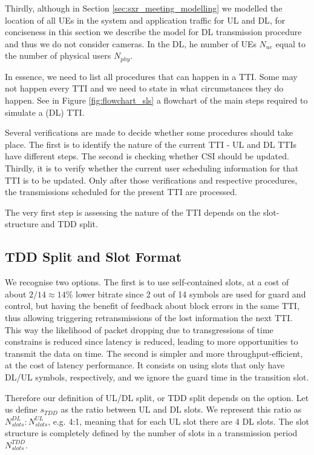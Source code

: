 Thirdly, although in Section \ref{sec:sxr_meeting_modelling} we modelled the location of all \acsp{UE} in the system and application traffic for \acs{UL} and \acs{DL}, for conciseness in this section we describe the model for \acs{DL} transmission procedure and thus we do not consider cameras. In the \acs{DL}, he number of UEs $N_{ue}$ equal to the number of physical users $N_{phy}$.

In essence, we need to list all procedures that can happen in a \acs{TTI}. Some may not happen every \acs{TTI} and we need to state in what circumstances they do happen. See in Figure \ref{fig:flowchart_sls} a flowchart of the main steps required to simulate a (\acs{DL}) \acs{TTI}.


Several verifications are made to decide whether some procedures should take place. The first is to identify the nature of the current \acs{TTI} - UL and DL TTIs have different steps. The second is checking whether CSI should be updated. Thirdly, it is to verify whether the current user scheduling information for that TTI is to be updated. Only after those verifications and respective procedures, the transmissions scheduled for the present TTI are processed. 

The very first step is assessing the nature of the TTI depends on the slot-structure and TDD split.

\subsection*{TDD Split and Slot Format}

We recognise two options. The first is to use self-contained slots, at a cost of about $2/14 \approx 14\%$ lower bitrate since 2 out of 14 symbols are used for guard and control, but having the benefit of feedback about block errors in the same TTI, thus allowing triggering retransmissions of the lost information the next TTI. This way the likelihood of packet dropping due to transgressions of time constrains is reduced since latency is reduced, leading to more opportunities to transmit the data on time. The second is simpler and more throughput-efficient, at the cost of latency performance. It consists on using slots that only have \ac{DL}/\ac{UL} symbols, respectively, and we ignore the guard time in the transition slot.

Therefore our definition of \ac{UL}/\ac{DL} split, or \ac{TDD} split depends on the option. Let us define $s_{TDD}$ as the ratio between UL and DL slots. We represent this ratio as $N^{DL}_{slots} : N^{UL}_{slots}$, e.g. 4:1, meaning that for each UL slot there are 4 DL slots. The slot structure is completely defined by the number of slots in a transmission period $N^{TDD}_{slots}$.

